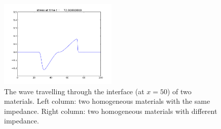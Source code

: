 \documentclass{article}
\begin{document}
\begin{figure}
  \includegraphics[width=0.5\textwidth]{reflect3.png}
  \caption{The wave travelling through the interface (at $x=50$) of two materials. Left column: two homogeneous materials with the same impedance. Right column: two homogeneous materials with different impedance.}
  \label{imp}
\end{figure}
\end{document}
